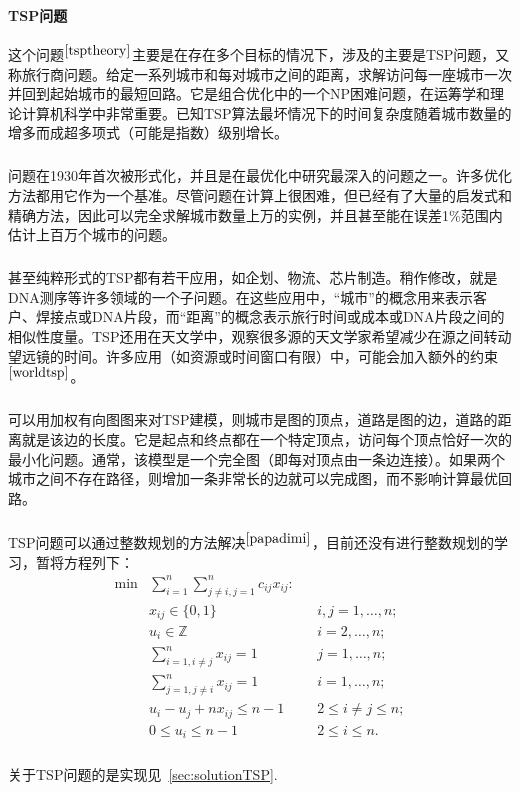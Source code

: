 \documentclass[UTF8,a4paper]{ctexart}
\begin{document}
\paragraph{TSP问题}这个问题$^{\cite{tsptheory}}$主要是在存在多个目标的情况下，涉及的主要是TSP问题，又称旅行商问题。给定一系列城市和每对城市之间的距离，求解访问每一座城市一次并回到起始城市的最短回路。它是组合优化中的一个NP困难问题，在运筹学和理论计算机科学中非常重要。已知TSP算法最坏情况下的时间复杂度随着城市数量的增多而成超多项式（可能是指数）级别增长。
\subparagraph{}问题在1930年首次被形式化，并且是在最优化中研究最深入的问题之一。许多优化方法都用它作为一个基准。尽管问题在计算上很困难，但已经有了大量的启发式和精确方法，因此可以完全求解城市数量上万的实例，并且甚至能在误差1\%范围内估计上百万个城市的问题。
\subparagraph{}甚至纯粹形式的TSP都有若干应用，如企划、物流、芯片制造。稍作修改，就是DNA测序等许多领域的一个子问题。在这些应用中，“城市”的概念用来表示客户、焊接点或DNA片段，而“距离”的概念表示旅行时间或成本或DNA片段之间的相似性度量。TSP还用在天文学中，观察很多源的天文学家希望减少在源之间转动望远镜的时间。许多应用（如资源或时间窗口有限）中，可能会加入额外的约束$^{\cite{worldtsp}}$。
\subparagraph{}可以用加权有向图图来对TSP建模，则城市是图的顶点，道路是图的边，道路的距离就是该边的长度。它是起点和终点都在一个特定顶点，访问每个顶点恰好一次的最小化问题。通常，该模型是一个完全图（即每对顶点由一条边连接）。如果两个城市之间不存在路径，则增加一条非常长的边就可以完成图，而不影响计算最优回路。
\subparagraph{}TSP问题可以通过整数规划的方法解决$^{\cite{papadimi}}$，目前还没有进行整数规划的学习，暂将方程列下：
\begin{align*}
    \min & \sum _{i=1}^{n}\sum _{j\neq i,j=1}^{n}c_{ij}x_{ij}\colon &  &                      \\
         & x_{ij}\in \{0,1\}                                        &  & i,j=1,\ldots ,n;     \\
         & u_{i}\in  \mathbb{Z}                                     &  & i=2,\ldots ,n;       \\
         & \sum _{i=1,i\neq j}^{n}x_{ij}=1                          &  & j=1,\ldots ,n;       \\
         & \sum _{j=1,j\neq i}^{n}x_{ij}=1                          &  & i=1,\ldots ,n;       \\
         & u_{i}-u_{j}+nx_{ij}\leq n-1                              &  & 2\leq i\neq j\leq n; \\
         & 0\leq u_{i}\leq n-1                                      &  & 2\leq i\leq n.
\end{align*}
\subparagraph{}关于TSP问题的是实现见~\ref{sec:solutionTSP}.
\end{document}

